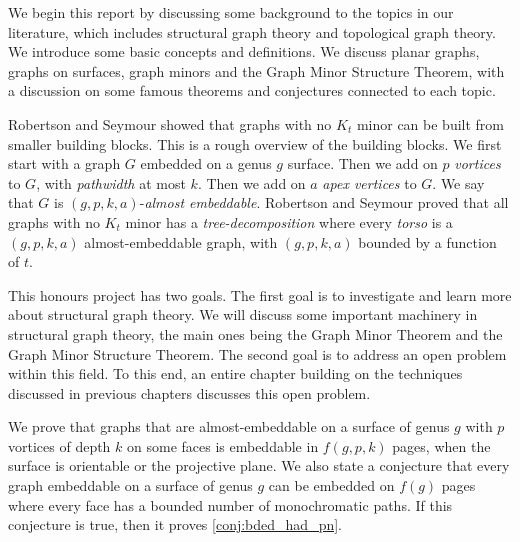 We begin this report by discussing some background to the topics in our literature, which includes structural graph theory and topological graph theory. We introduce some basic concepts and definitions. We discuss planar graphs, graphs on surfaces, graph minors and the Graph Minor Structure Theorem, with a discussion on some famous theorems and conjectures connected to each topic. 

Robertson and Seymour showed that graphs with no \(K_t\) minor can be built from smaller building blocks. This is a rough overview of the building blocks. We first start with a graph \(G\) embedded on a genus \(g\) surface. Then we add on \(p\) \textit{vortices} to \(G\), with \textit{pathwidth} at most \(k\). Then we add on \(a\) \textit{apex vertices} to \(G\). We say that \(G\) is \((g, p, k, a)\)-\textit{almost embeddable}. Robertson and Seymour \cite{robertsonGraphMinorsXVI2003} proved that all graphs with no \(K_t\) minor has a \textit{tree-decomposition} where every \textit{torso} is a \((g, p, k, a)\) almost-embeddable graph, with \((g, p, k, a)\) bounded by a function of \(t\).

This honours project has two goals. The first goal is to investigate and learn more about structural graph theory. We will discuss some important machinery in structural graph theory, the main ones being the Graph Minor Theorem and the Graph Minor Structure Theorem. The second goal is to address an open problem within this field. To this end, an entire chapter building on the techniques discussed in previous chapters discusses this open problem. 

We prove that graphs that are almost-embeddable on a surface of genus $g$ with $p$ vortices of depth $k$ on some faces is embeddable in $f(g, p, k)$ pages, when the surface is orientable or the projective plane. We also state a conjecture that every graph embeddable on a surface of genus $g$ can be embedded on $f(g)$ pages where every face has a bounded number of monochromatic paths. If this conjecture is true, then it proves \cref{conj:bded_had_pn}. 